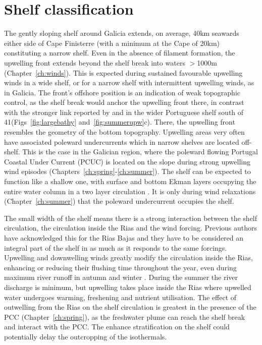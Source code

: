 \section{Shelf classification} The gently sloping shelf around
Galicia extends, on average, 40km seawards either side of Cape
Finisterre (with a minimum at the Cape of 20km) constituting a
narrow shelf.  Even in the absence of filament formation, the
upwelling front extends beyond the shelf break into waters
$>$1000m (Chapter~\ref{ch:winds}). This is expected during
sustained favourable upwelling winds in a wide shelf, or for a
narrow shelf with intermittent upwelling winds, as in Galicia. The
front's offshore position is an indication of weak topographic
control, as the shelf break would anchor the upwelling front
there, in contrast with the stronger link reported by
\citet{Fiuza96b} and \citet{Peliz02} in the wider Portuguese shelf
south of 41\deg (Figs~\ref{fig:largebathy}
and~\ref{fig:summerupw}c). There, the upwelling front resembles
the geometry of the bottom topography. Upwelling areas very often
have associated poleward undercurrents \citep{Neshyba89,Barton90}
which in narrow shelves are located off-shelf. This is the case in
the Galician region, where the poleward flowing Portugal Coastal
Under Current (PCUC) is located on the slope during strong
upwelling wind episodes
(Chapters~\ref{ch:spring}-\ref{ch:summer}). The shelf can be
expected to function like a shallow one, with surface and bottom
Ekman layers occupying the entire water column in a two layer
circulation \citep{Garvine71,Hill98}. It is only during wind
relaxations (Chapter~\ref{ch:summer}) that the poleward
undercurrent occupies the shelf.

The small width of the shelf means there is a strong interaction
between the shelf circulation, the circulation inside the Rias and
the wind forcing. Previous authors have acknowledged this for the
Rias Bajas \citep[e.g.][]{Gomez-Gesteira01,Prego01,Sordo01} and
they have to be considered an integral part of the shelf in as
much as it responds to the same forcings. Upwelling and
downwelling winds greatly modify the circulation inside the Rias,
enhancing or reducing their flushing time throughout the year,
even during maximum river runoff in autumn and winter
\citep{Alvarez-Salgado00}. During the summer the river discharge
is minimum, but upwelling takes place inside the Rias where
upwelled water undergoes warming, freshening and nutrient
utilisation. The effect of outwelling from the Rias on the shelf
circulation is greatest in the presence of the PCC
(Chapter~\ref{ch:spring}), as the freshwater plume can reach the
shelf break and interact with the PCC. The enhance stratification
on the shelf could potentially delay the outcropping of the
isothermals.


